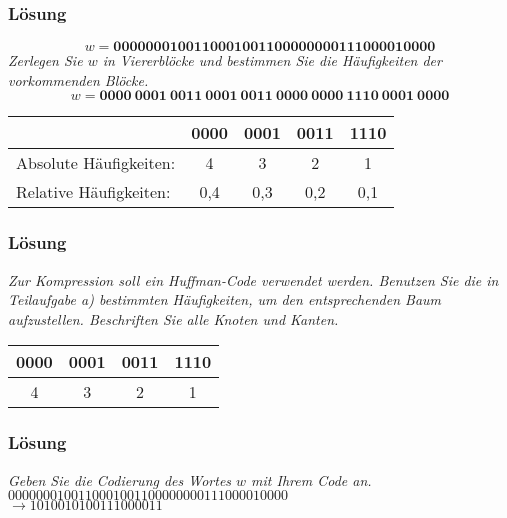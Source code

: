 \begin{frame}
	\frametitle{Lösung}
	$$w = \mathbf{0000000100110001001100000000111000010000}$$
	\textit{Zerlegen Sie $w$ in Viererblöcke und bestimmen Sie die Häufigkeiten der vorkommenden Blöcke.} \\[1em]
	\pause
	$$w = \mathbf{0000 \ 0001 \ 0011 \ 0001 \ 0011 \ 0000 \ 0000 \ 1110 \ 0001 \ 0000}$$ \pause
	\begin{table}[h!]
		\centering
		\begin{tabular}{l|cccc}	
			& 0000 & 0001 & 0011 & 1110 \\ \hline
			Absolute Häufigkeiten: & 4 & 3 & 2 & 1 \\
			Relative Häufigkeiten:  & 0,4 & 0,3 & 0,2 & 0,1\\
		\end{tabular}
	\end{table}
\end{frame}

\begin{frame}
	\frametitle{Lösung}
	\vspace*{1em}
	\begin{minipage}{0.45\linewidth}
		\textit{Zur Kompression soll ein Huffman-Code verwendet werden. Benutzen Sie die in Teilaufgabe a) bestimmten Häufigkeiten, um den entsprechenden Baum aufzustellen. Beschriften Sie alle Knoten und Kanten.}
		\pause 
		\begin{table}[h!]
			\centering
			\begin{tabular}{cccc}	
				0000 & 0001 & 0011 & 1110 \\ \hline
				4 & 3 & 2 & 1 \\	
			\end{tabular}
		\end{table}
	\end{minipage}
	\hfill
	\begin{minipage}{0.5\linewidth}
		\begin{figure}[h!]
			\centering
		\end{figure}
	\end{minipage}
\end{frame}

\begin{frame}
	\frametitle{Lösung}
	\textit{Geben Sie die Codierung des Wortes $w$ mit Ihrem Code an.} \\[2em] \pause
	$0000000100110001001100000000111000010000$ \\ \hfill $\to 1010010100111000011$
\end{frame}

